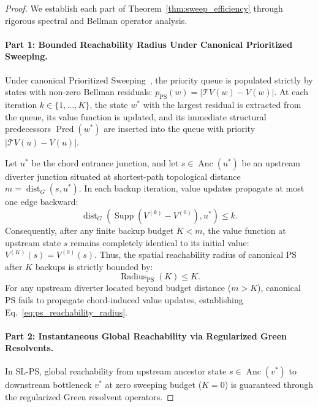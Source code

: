 \documentclass[11pt,a4paper]{article}
\begin{document}
\begin{proof}
We establish each part of Theorem~\ref{thm:sweep_efficiency} through rigorous spectral and Bellman operator analysis.

\paragraph{Part 1: Bounded Reachability Radius Under Canonical Prioritized Sweeping.}
Under canonical Prioritized Sweeping~\cite{moore1993prioritized}, the priority queue is populated strictly by states with non-zero Bellman residuals: $p_{\text{PS}}(w) = |\mathcal{T} V(w) - V(w)|$. At each iteration $k \in \{1, \dots, K\}$, the state $w^*$ with the largest residual is extracted from the queue, its value function is updated, and its immediate structural predecessors $\operatorname{Pred}(w^*)$ are inserted into the queue with priority $|\mathcal{T} V(u) - V(u)|$.

Let $u^*$ be the chord entrance junction, and let $s \in \operatorname{Anc}(u^*)$ be an upstream diverter junction situated at shortest-path topological distance $m = \operatorname{dist}_G(s, u^*)$. In each backup iteration, value updates propagate at most one edge backward:
\begin{equation}
\label{eq:ps_one_step_propagation}
\operatorname{dist}_G(\operatorname{Supp}(V^{(k)} - V^{(0)}), u^*) \le k.
\end{equation}
Consequently, after any finite backup budget $K < m$, the value function at upstream state $s$ remains completely identical to its initial value: $V^{(K)}(s) = V^{(0)}(s)$. Thus, the spatial reachability radius of canonical PS after $K$ backups is strictly bounded by:
\begin{equation}
\operatorname{Radius}_{\text{PS}}(K) \le K.
\end{equation}
For any upstream diverter located beyond budget distance ($m > K$), canonical PS fails to propagate chord-induced value updates, establishing Eq.~\eqref{eq:ps_reachability_radius}.

\paragraph{Part 2: Instantaneous Global Reachability via Regularized Green Resolvents.}
In SL-PS, global reachability from upstream ancestor state $s \in \operatorname{Anc}(v^*)$ to downstream bottleneck $v^*$ at zero sweeping budget ($K = 0$) is guaranteed through the regularized Green resolvent operators.


\end{proof}
\end{document}
